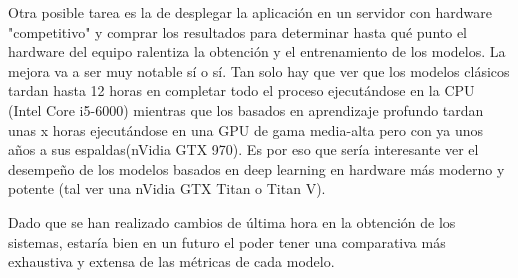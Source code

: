 Otra posible tarea es la de desplegar la aplicación en un servidor con hardware "competitivo" y comprar los resultados para determinar hasta qué punto el hardware del equipo ralentiza la obtención y el entrenamiento de los modelos. La mejora va a ser muy notable sí o sí. Tan solo hay que ver que los modelos clásicos tardan hasta 12 horas en completar todo el proceso ejecutándose en la CPU (Intel Core i5-6000) mientras que los basados en aprendizaje profundo tardan unas x horas ejecutándose en una GPU de gama media-alta pero con ya unos años a sus espaldas(nVidia GTX 970). Es por eso que sería interesante ver el desempeño de los modelos basados en deep learning en hardware más moderno y potente (tal ver una nVidia GTX Titan o Titan V).

Dado que se han realizado cambios de última hora en la obtención de los sistemas, estaría bien en un futuro el poder tener una comparativa más exhaustiva y extensa de las métricas de cada modelo.